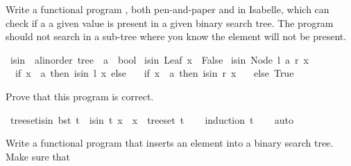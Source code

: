 \begin{isabellebody}
\begin{isamarkuptext}
    Write a functional program , both pen-and-paper and in Isabelle, which can check if a
    a given value is present in a given binary search tree. The program should not search in a
    sub-tree where you know the element will not be present.%
\end{isamarkuptext}\isamarkuptrue%
\isamarkupfalse%
\ isin\ {\isacharcolon}{\kern0pt}{\isacharcolon}{\kern0pt}\ {\isachardoublequoteopen}{\isacharparenleft}{\kern0pt}{\isacharprime}{\kern0pt}a{\isacharcolon}{\kern0pt}{\isacharcolon}{\kern0pt}linorder{\isacharparenright}{\kern0pt}\ tree\ {\isasymRightarrow}\ {\isacharprime}{\kern0pt}a\ {\isasymRightarrow}\ bool{\isachardoublequoteclose}\ \isanewline
\isanewline
{\isachardoublequoteopen}isin\ Leaf\ x\ {\isacharequal}{\kern0pt}\ False{\isachardoublequoteclose}\ {\isacharbar}{\kern0pt}\isanewline
{\isachardoublequoteopen}isin\ {\isacharparenleft}{\kern0pt}Node\ l\ a\ r{\isacharparenright}{\kern0pt}\ x\ {\isacharequal}{\kern0pt}\isanewline
\ \ {\isacharparenleft}{\kern0pt}if\ x\ {\isacharless}{\kern0pt}\ a\ then\ isin\ l\ x\ else\isanewline
\ \ \ if\ x\ {\isachargreater}{\kern0pt}\ a\ then\ isin\ r\ x\isanewline
\ \ \ else\ True{\isacharparenright}{\kern0pt}{\isachardoublequoteclose}%
\begin{isamarkuptext}%
Prove that this program is correct.%
\end{isamarkuptext}\isamarkuptrue%
\isamarkupfalse%
\ tree{\isacharunderscore}{\kern0pt}set{\isacharunderscore}{\kern0pt}isin{\isacharcolon}{\kern0pt}\ {\isachardoublequoteopen}bst\ t\ {\isasymLongrightarrow}\ isin\ t\ x\ {\isacharequal}{\kern0pt}\ {\isacharparenleft}{\kern0pt}x\ {\isasymin}\ tree{\isacharunderscore}{\kern0pt}set\ t{\isacharparenright}{\kern0pt}{\isachardoublequoteclose}\isanewline
%
\isadelimproof
\isanewline
\ \ %
\endisadelimproof
%
\isatagproof
{}\isamarkupfalse%
\ {\isacharparenleft}{\kern0pt}induction\ t{\isacharparenright}{\kern0pt}\isanewline
\ \ \isamarkupfalse%
\ {\isacharparenleft}{\kern0pt}auto{\isacharparenright}{\kern0pt}\isanewline
\ \ \isamarkupfalse%
%
\endisatagproof
{\isafoldproof}%
%
\isadelimproof
%
\endisadelimproof
%
\begin{isamarkuptext}%
%
\end{isamarkuptext}\isamarkuptrue%
%
\begin{isamarkuptext}%
Write a functional program that inserts an element into a binary search tree. Make sure that

\end{isamarkuptext}
\end{isabellebody}
